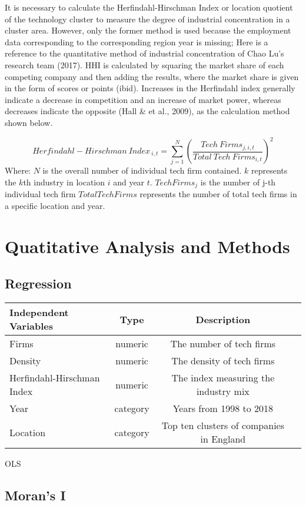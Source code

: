 \documentclass[
  12pt,
  oneside]{book}
\begin{document}
It is necessary to calculate the Herfindahl-Hirschman Index or location quotient of the technology cluster to measure the degree of industrial concentration in a cluster area. However, only the former method is used because the employment data corresponding to the corresponding region year is missing; Here is a reference to the quantitative method of industrial concentration of Chao Lu's research team (2017). HHI is calculated by squaring the market share of each competing company and then adding the results, where the market share is given in the form of scores or points (ibid). Increases in the Herfindahl index generally indicate a decrease in competition and an increase of market power, whereas decreases indicate the opposite (Hall \& et al., 2009), as the calculation method shown below.

\[ Herfindahl-Hirschman \ Index_{\ i,t} = \sum_{j=1}^N (\frac{Tech\ Firms_{j,i,t}}{Total\ Tech\ Firms_{i,t}})^2 \]
Where:
\(N\) is the overall number of individual tech firm contained.
\(k\) represents the \(k\)th industry in location \(i\) and year \(t\).
\(Tech Firms_j\) is the number of j-th individual tech firm
\(Total Tech Firms\) represents the number of total tech firms in a specific location and year.

\hypertarget{quatitative-analysis-and-methods}{%
\section{Quatitative Analysis and Methods}\label{quatitative-analysis-and-methods}}

\hypertarget{regression}{%
\subsection{Regression}\label{regression}}

\begin{longtable}[]{@{}lccr@{}}
\toprule
Independent Variables & Type & Description &\tabularnewline
\midrule
\endhead
Firms & numeric & The number of tech firms &\tabularnewline
Density & numeric & The density of tech firms &\tabularnewline
Herfindahl-Hirschman Index & numeric & The index measuring the industry mix &\tabularnewline
Year & category & Years from 1998 to 2018 &\tabularnewline
Location & category & Top ten clusters of companies in England &\tabularnewline
\bottomrule
\end{longtable}

OLS

\hypertarget{morans-i}{%
\subsection{Moran's I}\label{morans-i}}
\end{document}
